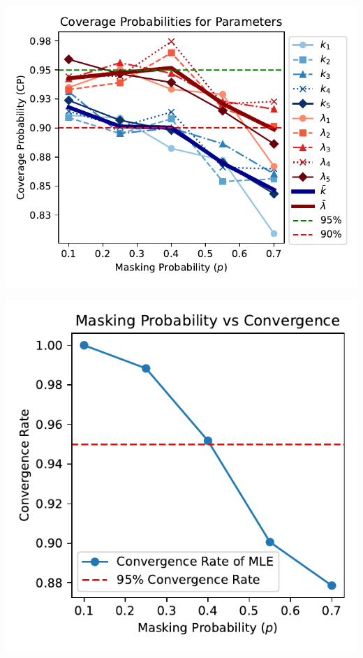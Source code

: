 \documentclass{article}
\begin{document}

\noindent
\begin{minipage}[t]{0.55\textwidth}
  \centering
  \includegraphics[width=\textwidth,height=0.33\textheight,keepaspectratio]{combined-cp.pdf}
\end{minipage}%
\begin{minipage}[t]{0.4\textwidth}
  \centering
  \includegraphics[width=\textwidth,height=0.33\textheight,keepaspectratio]{p_vs_convergence.pdf}
\end{minipage}
\end{document}
